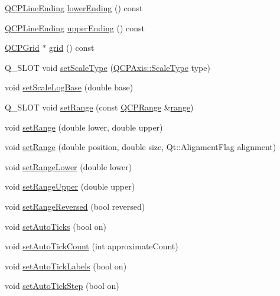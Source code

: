 \begin{DoxyCompactItemize}
\item 
\hyperlink{classQCPLineEnding}{Q\+C\+P\+Line\+Ending} \hyperlink{classQCPAxis_ac85aebbedf67d7bc9e1e5c182151536b}{lower\+Ending} () const 
\item 
\hyperlink{classQCPLineEnding}{Q\+C\+P\+Line\+Ending} \hyperlink{classQCPAxis_aad503ac95ee34e614ffee0bd66473e1a}{upper\+Ending} () const 
\item 
\hyperlink{classQCPGrid}{Q\+C\+P\+Grid} $\ast$ \hyperlink{classQCPAxis_ac4fb913cce3072b5e75a4635e0f6cd04}{grid} () const 
\item 
Q\+\_\+\+S\+L\+OT void \hyperlink{classQCPAxis_adef29cae617af4f519f6c40d1a866ca6}{set\+Scale\+Type} (\hyperlink{classQCPAxis_a36d8e8658dbaa179bf2aeb973db2d6f0}{Q\+C\+P\+Axis\+::\+Scale\+Type} type)
\item 
void \hyperlink{classQCPAxis_a726186054be90487885a748aa1b42188}{set\+Scale\+Log\+Base} (double base)
\item 
Q\+\_\+\+S\+L\+OT void \hyperlink{classQCPAxis_aebdfea5d44c3a0ad2b4700cd4d25b641}{set\+Range} (const \hyperlink{classQCPRange}{Q\+C\+P\+Range} \&\hyperlink{classQCPAxis_ab1ea79a4f5ea4cf42620f8f51c477ac4}{range})
\item 
void \hyperlink{classQCPAxis_a57d6ee9e9009fe88cb19db476ec70bca}{set\+Range} (double lower, double upper)
\item 
void \hyperlink{classQCPAxis_acf60e5b2d631fbc8c4548c3d579cb6d0}{set\+Range} (double position, double size, Qt\+::\+Alignment\+Flag alignment)
\item 
void \hyperlink{classQCPAxis_afcf51227d337db28d1a9ce9a4d1bc91a}{set\+Range\+Lower} (double lower)
\item 
void \hyperlink{classQCPAxis_acd3ca1247aa867b540cd5ec30ccd3bef}{set\+Range\+Upper} (double upper)
\item 
void \hyperlink{classQCPAxis_a2172fdb196b1a0dc3f40992fcad8e9e1}{set\+Range\+Reversed} (bool reversed)
\item 
void \hyperlink{classQCPAxis_ae867c23d3a6a7bd4d09cc66c5d018f63}{set\+Auto\+Ticks} (bool on)
\item 
void \hyperlink{classQCPAxis_a7c7111cbeac9ec5fcb40f93a1ef51a0b}{set\+Auto\+Tick\+Count} (int approximate\+Count)
\item 
void \hyperlink{classQCPAxis_aaa47e3a6bac0c20d4beb9028f01bc1a1}{set\+Auto\+Tick\+Labels} (bool on)
\item 
void \hyperlink{classQCPAxis_a99fe77b034e06f5b723995beab96e741}{set\+Auto\+Tick\+Step} (bool on)
\item 

\end{DoxyCompactItemize}
